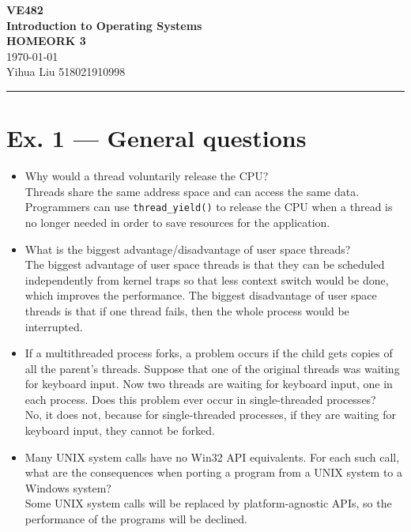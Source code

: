 \documentclass[a4paper]{article}
\begin{document}
\begin{center}
    \huge
    \textbf{VE482\\Introduction to Operating Systems\\}
    \Large
    \vspace{15pt}
    \uppercase{\textbf{Homeork 3}}\\
    \large
    \vspace{5pt}\today\\
    \vspace{5pt}
    Yihua Liu 518021910998
    \vspace{5pt}
    \rule[-5pt]{.97\linewidth}{0.05em}
\end{center}
\section*{Ex. 1 — General questions}
\begin{itemize}
    \item Why would a thread voluntarily release the CPU?\\
    Threads share the same address space and can access the same data. Programmers can use \texttt{thread\_yield()} to release the CPU when a thread is no longer needed in order to save resources for the application.
    \item What is the biggest advantage/disadvantage of user space threads?\\
    The biggest advantage of user space threads is that they can be scheduled independently from kernel traps so that less context switch would be done, which improves the performance. The biggest disadvantage of user space threads is that if one thread fails, then the whole process would be interrupted.
    \item If a multithreaded process forks, a problem occurs if the child gets copies of all the parent’s threads. Suppose that one of the original threads was waiting for keyboard input. Now two threads are waiting for keyboard input, one in each process. Does this problem ever occur in single-threaded processes?\\
    No, it does not, because for single-threaded processes, if they are waiting for keyboard input, they cannot be forked.
    \item Many UNIX system calls have no Win32 API equivalents. For each such call, what are the consequences when porting a program from a UNIX system to a Windows system?\\
    Some UNIX system calls will be replaced by platform-agnostic APIs, so the performance of the programs will be declined.
\end{itemize}
\end{document}
